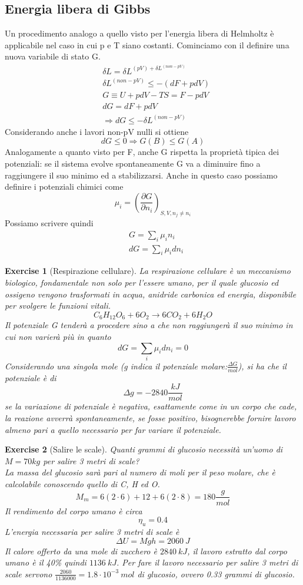 \documentclass[10pt,a4paper]{article}
\newtheorem{exercise}{Exercise}
\begin{document}
\subsection{Energia libera di Gibbs}
Un procedimento analogo a quello visto per l'energia libera di Helmholtz è applicabile nel caso in cui p e T siano costanti. Cominciamo con il definire una nuova variabile di stato G. 
\begin{align*}
	&\delta L = \delta L^{(pV) + \delta L^{(non-pV)}}\\
	&\delta L^{(non-pV)} \leq -(dF + pdV)\\
	&G \equiv U + pdV -TS = F -pdV\\
	&dG = dF + pdV\\
	&\Rightarrow dG \leq -\delta L^{(non-pV)}
\end{align*}
Considerando anche i lavori non-pV nulli si ottiene
\[dG\leq 0 \Rightarrow G(B)\leq G(A)\]
Analogamente a quanto visto per F, anche G rispetta la proprietà tipica dei potenziali: se il sistema evolve spontaneamente G va a diminuire fino a raggiungere il suo minimo ed a stabilizzarsi. Anche in questo caso possiamo definire i potenziali chimici come 
\[\mu_i = \left(\frac{\partial G}{\partial n_i}\right)_{S,V,n_j\neq n_i}\]
Possiamo scrivere quindi
\begin{align*}
	&G = \sum_i \mu_i n_i\\
	&dG = \sum_i \mu_i dn_i
\end{align*}
\begin{exercise}[Respirazione cellulare]
	La respirazione cellulare è un meccanismo biologico, fondamentale non solo per l'essere umano, per il quale glucosio ed ossigeno vengono trasformati in acqua, anidride carbonica ed energia, disponibile per svolgere le funzioni vitali.
	\[C_6H_{12}O_6 + 6O_2\rightarrow 6CO_2 + 6H_2O\]
	Il potenziale G tenderà a procedere sino a che non raggiungerà il suo minimo in cui non varierà più in quanto 
	\[dG = \sum_i \mu_i dn_i = 0\]
	Considerando una singola mole (g indica il potenziale molare:$\frac{ \Delta G}{mol}$), si ha che il potenziale è di 
	\[\Delta g = -2840 \frac{kJ}{mol}\]
	se la variazione di potenziale è negativa, esattamente come in un corpo che cade, la reazione avverrà spontaneamente, se fosse positivo, bisognerebbe fornire lavoro almeno pari a quello necessario per far variare il potenziale.  
\end{exercise}
\begin{exercise}[Salire le scale]
	Quanti grammi di glucosio necessità un'uomo di \(M = 70 kg\) per salire 3 metri di scale?\\
	La massa del glucosio sarà pari al numero di moli per il peso molare, che è calcolabile conoscendo quello di C, H ed O. 
	\[M_m = 6(2\cdot 6)+12+6(2\cdot 8) = 180\frac{g}{mol}\]
	Il rendimento del corpo umano è circa
	\[\eta_{u} = 0.4\]
	L'energia necessaria per salire 3 metri di scale è
	\[\Delta U = M g h = 2060\ J\]
	Il calore offerto da una mole di zucchero è \(2840\ kJ\), il lavoro estratto dal corpo umano è il 40\% quindi \(1136\ kJ\). Per fare il lavoro necessario per salire 3 metri di scale servono \(\frac{2060}{1136000}= 1.8\cdot 10^{-3}\ mol\) di glucosio, ovvero 0.33 grammi di glucosio. 
\end{exercise}
\end{document}
